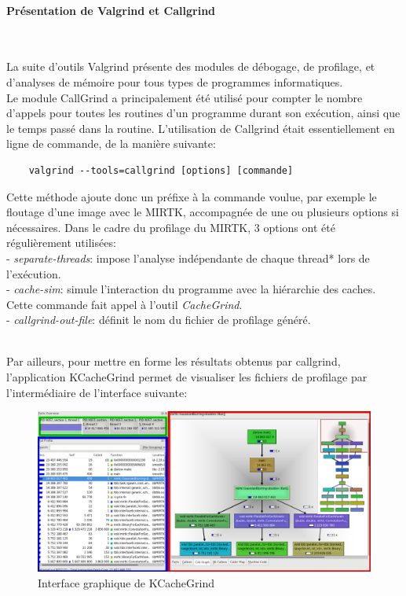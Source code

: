 \documentclass[10pt]{report}
\begin{document}
 \paragraph{Présentation de Valgrind et Callgrind}~\par
 La suite d'outils Valgrind présente des modules de débogage, de profilage, et d'analyses de mémoire pour tous types de programmes informatiques. \\
 Le module CallGrind a principalement été utilisé pour compter le nombre d'appels pour toutes les routines d'un programme durant son exécution, ainsi que le temps passé dans la routine. L'utilisation de Callgrind était essentiellement en ligne de commande, 
 de la manière suivante:
 	\begin{lstlisting}
 	valgrind --tools=callgrind [options] [commande]
 	\end{lstlisting}
 Cette méthode ajoute donc un préfixe à la commande voulue, par exemple le floutage d'une image avec le MIRTK, accompagnée de une ou plusieurs options si nécessaires. Dans le cadre du profilage du MIRTK, 3 options ont été régulièrement utilisées: \\
 - \textit{separate-threads}: impose l'analyse indépendante de chaque thread* lors de l'exécution.\\
 - \textit{cache-sim}: simule l'interaction du programme avec la hiérarchie des caches. Cette commande fait appel à l'outil \textit{CacheGrind}.\\
 - \textit{callgrind-out-file}: définit le nom du fichier de profilage généré.\\ ~\par
 Par ailleurs, pour mettre en forme les résultats obtenus par callgrind, l'application KCacheGrind permet de visualiser les fichiers de profilage par l'intermédiaire de l'interface suivante:\\
\begin{figure}[h!]
	\begin{center}
		\includegraphics[width=18cm]{Reports/figures/UIkcachegrind.png}	
	\end{center}
	\caption{Interface graphique de KCacheGrind}
	\label{Interface graphique de KCacheGrind}
\end{figure}\\
\end{document}
